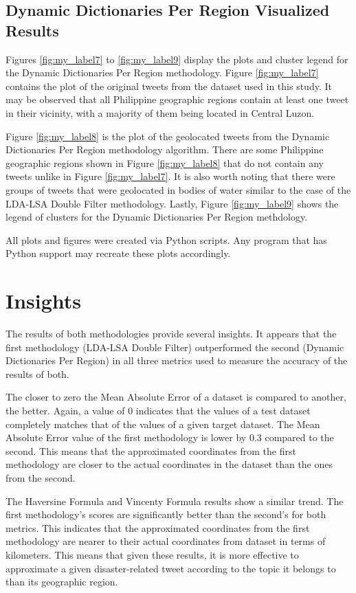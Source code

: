 \subsection{Dynamic Dictionaries Per Region Visualized Results}
Figures \ref{fig:my_label7} to \ref{fig:my_label9} display the plots and cluster legend for the Dynamic Dictionaries Per Region methodology. Figure \ref{fig:my_label7} contains the plot of the original tweets from the dataset used in this study. It may be observed that all Philippine geographic regions contain at least one tweet in their vicinity, with a majority of them being located in Central Luzon. 

Figure \ref{fig:my_label8} is the plot of the geolocated tweets from the Dynamic Dictionaries Per Region methodology algorithm. There are some Philippine geographic regions shown in Figure \ref{fig:my_label8} that do not contain any tweets unlike in Figure \ref{fig:my_label7}. It is also worth noting that there were groups of tweets that were geolocated in bodies of water similar to the case of the LDA-LSA Double Filter methodology. Lastly, Figure \ref{fig:my_label9} shows the legend of clusters for the Dynamic Dictionaries Per Region methdology.

All plots and figures were created via Python scripts. Any program that has Python support may recreate these plots accordingly. 

\section{Insights}
The results of both methodologies provide several insights. It appears that the first methodology (LDA-LSA Double Filter) outperformed the second (Dynamic Dictionaries Per Region) in all three metrics used to measure the accuracy of the results of both.

The closer to zero the Mean Absolute Error of a dataset is compared to another, the better. Again, a value of 0 indicates that the values of a test dataset completely matches that of the values of a given target dataset. The Mean Absolute Error value of the first methodology is lower by 0.3 compared to the second. This means that the approximated coordinates from the first methodology are closer to the actual coordinates in the dataset than the ones from the second.

The Haversine Formula and Vincenty Formula results show a similar trend. The first methodology's scores are significantly better than the second's for both metrics. This indicates that the approximated coordinates from the first methodology are nearer to their actual coordinates from dataset in terms of kilometers. This means that given these results, it is more effective to approximate a given disaster-related tweet according to the topic it belongs to than its geographic region. 

